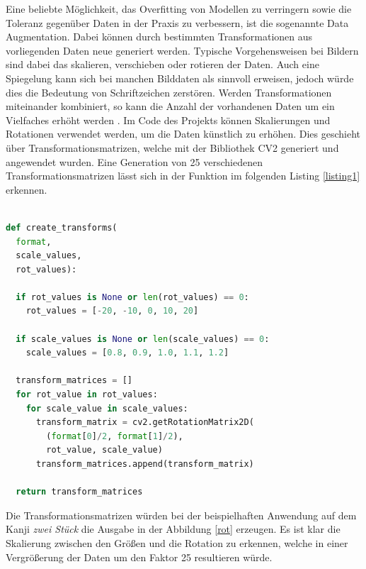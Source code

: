 \documentclass[twoside,a4paper]{IEEEtran}
\begin{document}
Eine beliebte Möglichkeit, das Overfitting von Modellen zu verringern sowie die Toleranz gegenüber Daten in der Praxis zu verbessern, ist die sogenannte Data Augmentation. Dabei können durch bestimmten Transformationen aus vorliegenden Daten neue generiert werden. Typische Vorgehensweisen bei Bildern sind dabei das skalieren, verschieben oder rotieren der Daten. Auch eine Spiegelung kann sich bei manchen Bilddaten als sinnvoll erweisen, jedoch würde dies die Bedeutung von Schriftzeichen zerstören. Werden Transformationen miteinander kombiniert, so kann die Anzahl der vorhandenen Daten um ein Vielfaches erhöht werden \cite[S.311]{MACHINE_LEARNING}. Im Code des Projekts können Skalierungen und Rotationen verwendet werden, um die Daten künstlich zu erhöhen. Dies geschieht über Transformationsmatrizen, welche mit der Bibliothek CV2 generiert und angewendet wurden. Eine Generation von 25 verschiedenen Transformationsmatrizen lässt sich in der Funktion im folgenden Listing \ref{listing1} erkennen.
\begin{lstlisting}[language=python,label=listing1,caption={Python-Code für die Generierung von Transformationsmatrizen}]
	
def create_transforms(
  format, 
  scale_values, 
  rot_values):
  
  if rot_values is None or len(rot_values) == 0:
    rot_values = [-20, -10, 0, 10, 20]
	
  if scale_values is None or len(scale_values) == 0:
    scale_values = [0.8, 0.9, 1.0, 1.1, 1.2]
	
  transform_matrices = []
  for rot_value in rot_values:
    for scale_value in scale_values:
      transform_matrix = cv2.getRotationMatrix2D(
        (format[0]/2, format[1]/2),
        rot_value, scale_value)
      transform_matrices.append(transform_matrix)

  return transform_matrices
\end{lstlisting}
Die Transformationsmatrizen würden bei der beispielhaften Anwendung auf dem Kanji \textit{zwei Stück} die Ausgabe in der Abbildung \ref{rot} erzeugen. Es ist klar die Skalierung zwischen den Größen und die Rotation zu erkennen, welche in einer Vergrößerung der Daten um den Faktor 25 resultieren würde.
\end{document}
